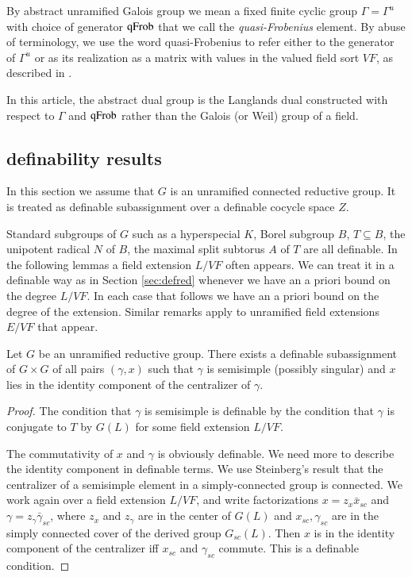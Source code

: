 By abstract unramified Galois group we mean a fixed finite cyclic
group $\Gamma=\Gamma^u$ with choice of generator ${\operatorname{qFrob}}$ that we
call the {\it quasi-Frobenius} element.  By abuse of terminology, we use
the word quasi-Frobenius to refer either to the generator of $\Gamma^u$
or as its realization as a matrix with values in the valued field sort $VF$,
as described in \cite{cluckers2011transfer}.

In this article, the abstract dual group is the Langlands dual
constructed with respect to $\Gamma$ and ${\operatorname{qFrob}}$ rather than the
Galois (or Weil) group of a field.

\subsection{definability results}\label{sec:definability}

In this section we assume that $G$ is an unramified connected
reductive group.  It is treated as definable subassignment over a
definable cocycle space $Z$.

Standard subgroups of $G$ such as a hyperspecial $K$, Borel subgroup
$B$, $T\subseteq B$, the unipotent radical $N$ of $B$, the maximal
split subtorus $A$ of $T$ are all definable.  In the following lemmas
a field extension $L/VF$ often appears.  We can treat it in a
definable way as in Section \ref{sec:defred} whenever we have an a
priori bound on the degree $L/VF$.  In each case that follows we have
an a priori bound on the degree of the extension.  Similar remarks
apply to unramified field extensions $E/VF$ that appear.

\begin{lemma}  
  Let $G$ be an unramified reductive group.  There exists a definable
  subassignment of $G\times G$ of all pairs $(\gamma,x)$ such that
  $\gamma$ is semisimple (possibly singular) and $x$ lies in the
  identity component of the centralizer of $\gamma$.
\end{lemma}

\begin{proof}  The condition that $\gamma$ is semisimple 
is definable by the condition that $\gamma$ is conjugate to $T$ by
$G(L)$ for some field extension $L/VF$. 

The commutativity of $x$ and $\gamma$ is obviously definable.  We need
more to describe the identity component in definable terms.  We use
Steinberg's result that the centralizer of a semisimple element in a
simply-connected group is connected.  We work again over a field
extension $L/VF$, and write factorizations $x = z_x \bar x_{sc}$ and
$\gamma = z_\gamma \bar \gamma_{sc}$, where $z_x$ and $z_\gamma$ are
in the center of $G(L)$ and $x_{sc},\gamma_{sc}$ are in the simply
connected cover of the derived group $G_{sc}(L)$.  Then $x$ is in the
identity component of the centralizer iff $x_{sc}$ and $\gamma_{sc}$
commute.  This is a definable condition.
\end{proof}

